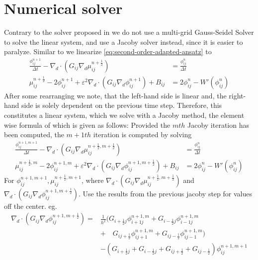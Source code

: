 \documentclass{mimosis}
\begin{document}
\chapter{Numerical solver}
\label{sec:orgef27af3}
Contrary to the solver proposed in\autocite{Ulmer_CHRelaxed_2024} we do not use a multi-grid Gauss-Seidel Solver to solve the linear system, and use a Jacoby solver instead, since it is easier to paralyze.
Similar to \autocite{Ulmer_CHRelaxed_2024} we linearize \eqref{eq:second-order-adapted-ansatz} to
\begin{equation}
\begin{aligned}
\frac{\phi_{ij}^{n+1}}{\Delta t}  -  \nabla _d \cdot (G_{ij} \nabla_d \mu_{ij}^{n+\frac{1}{2}} ) &= \frac{ \phi_{ij}^n}{\Delta t}  \\
 \mu_{ij}^{n+\frac{1}{2}} - 2\phi_{ij}^{n+1} + \varepsilon^2  \nabla_d \cdot  (G_{ij} \nabla _d \phi_{ij}^{n+1} ) + B_{ij} &=2\phi _{ij}^n - W'(\phi_{ij}^n)
\end{aligned}
\end{equation}
After some rearranging we note, that the left-hand side is linear and, the right-hand side is solely dependent on the previous time step. Therefore, this constitutes a linear system, which we solve with a Jacoby method, the element wise formula of which is given as follows:
Provided the \(mth\) Jacoby iteration has been computed, the \(m+1th\) iteration is computed by solving
\begin{equation}
\begin{aligned}
\frac{\phi_{ij}^{n+1,m+1}}{\Delta t}  -  \nabla _d \cdot (G_{ij} \nabla_d \mu_{ij}^{n+\frac{1}{2},m+\frac{1}{2}} ) &= \frac{ \phi_{ij}^{n}}{\Delta t}  \\
 \mu_{ij}^{n+\frac{1}{2},m} - 2\phi_{ij}^{n+1,m} + \varepsilon^2  \nabla_d \cdot  (G_{ij} \nabla _d \phi_{ij}^{n+1,m+\frac{1}{2}} ) + B_{ij} &=2\phi _{ij}^n - W'(\phi_{ij}^n)
\end{aligned}
\end{equation}
For \(\phi_{ij}^{n+1,m+1} , \mu_{ij}^{n+\frac{1}{2},m+1}\),
where \(\nabla _d \cdot (G_{ij} \nabla_d \mu_{ij}^{n+\frac{1}{2},m+\frac{1}{2}} )\) and \(\nabla_d \cdot  (G_{ij} \nabla _d \phi_{ij}^{n+1,m+\frac{1}{2}} )\).  Use the results from the previous jacoby step for values off the center. eg.
\begin{equation}
\begin{aligned}
 \nabla _d \cdot (G_{ij} \nabla_d \phi_{ij}^{n+1,m+\frac{1}{2}} )  =&
\frac{1}{h^2} (
G_{i+\frac{1}{2}j}\phi_{i+1j}^{n+1,m}
+ G_{i-\frac{1}{2}j}\phi_{i-1j}^{n+1,m} \\
& + \quad G_{ij+\frac{1}{2}}\phi_{ij+1}^{n+1,m}
+ G_{ij-\frac{1}{2}}\phi_{ij-1}^{n+1,m}
 ) \\
& -
\left(
 G_{i+\frac{1}{2}j}
 + G_{i-\frac{1}{2}j}
 + G_{ij+\frac{1}{2}}
 + G_{ij-\frac{1}{2}}
\right)\phi_{ij}^{n+1,m+1}
\end{aligned}
\end{equation}
\end{document}
